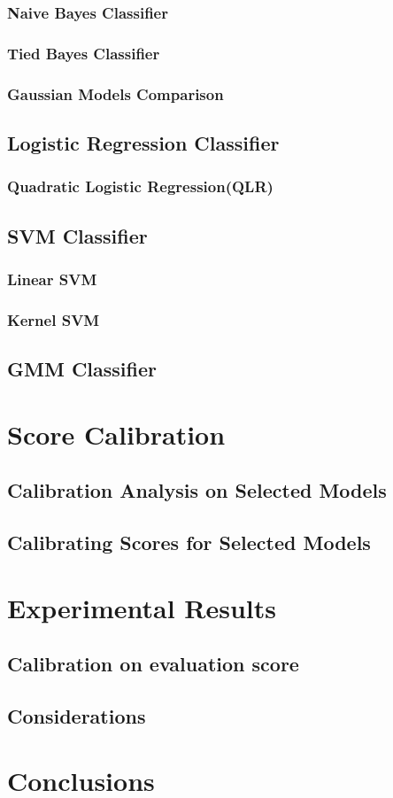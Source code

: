 \documentclass{article}
\begin{document}
\subsubsection{Naive Bayes Classifier}
\subsubsection{Tied Bayes Classifier}
\subsubsection{Gaussian Models Comparison}
\subsection{Logistic Regression Classifier}
\subsubsection{Quadratic Logistic Regression(QLR)}
\subsection{SVM Classifier}
\subsubsection{Linear SVM}
\subsubsection{Kernel SVM}
\subsection{GMM Classifier}
\section{Score Calibration}
\subsection{Calibration Analysis on Selected Models}
\subsection{Calibrating Scores for Selected Models}
\section{Experimental Results}
\subsection{Calibration on evaluation score}
\subsection{Considerations}
\section{Conclusions}


\newpage



\end{document}
